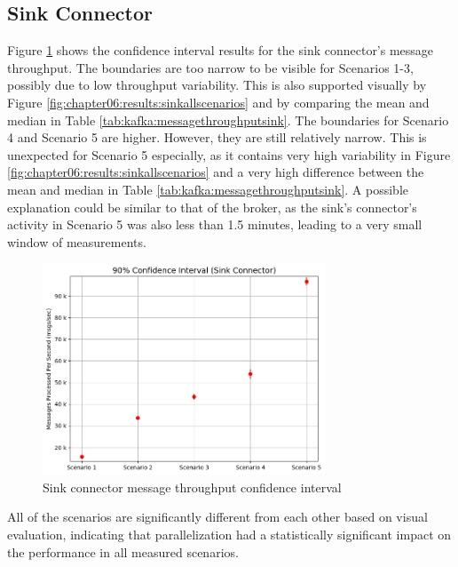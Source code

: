 \subsection{Sink Connector}
Figure \ref{fig:chapter07:discussion:sinkmessageci} shows the confidence interval results for the sink connector's message throughput. The boundaries are too narrow to be visible for Scenarios 1-3, possibly due to low throughput variability. This is also supported visually by Figure \ref{fig:chapter06:results:sinkallscenarios} and by comparing the mean and median in Table \ref{tab:kafka:messagethroughputsink}. The boundaries for Scenario 4 and Scenario 5 are higher. However, they are still relatively narrow. This is unexpected for Scenario 5 especially, as it contains very high variability in Figure \ref{fig:chapter06:results:sinkallscenarios} and a very high difference between the mean and median in Table \ref{tab:kafka:messagethroughputsink}. A possible explanation could be similar to that of the broker, as the sink's connector's activity in Scenario 5 was also less than 1.5 minutes, leading to a very small window of measurements.

\begin{figure}[htbp]
    \centering
    \includegraphics[width=0.75\textwidth]{chapters/images/confidence-intervals/sink-message-ci.png}
    \caption{Sink connector message throughput confidence interval}
    \label{fig:chapter07:discussion:sinkmessageci}
\end{figure}

All of the scenarios are significantly different from each other based on visual evaluation, indicating that parallelization had a statistically significant impact on the performance in all measured scenarios.


